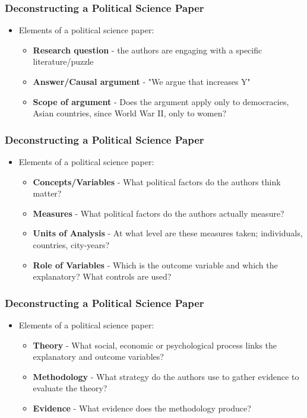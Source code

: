 \documentclass[xcolor=x11names,compress]{beamer}\usepackage[]{graphicx}\usepackage[]{color}
\renewcommand{\(}{\begin{columns}}
\renewcommand{\)}{\end{columns}}
\newcommand{\<}[1]{\begin{column}{#1}}
\renewcommand{\>}{\end{column}}
\begin{document}
\begin{frame}
\begin{frame}
\begin{frame}
\frametitle{Deconstructing a Political Science Paper}
\begin{itemize}
\item Elements of a political science paper:
\begin{itemize}
\item \textbf{Research question} - the authors are engaging with a specific literature/puzzle
\item \textbf{Answer/Causal argument} - "We argue that  increases Y"
\item \textbf{Scope of argument} - Does the argument apply only to democracies, Asian countries, since World War II, only to women?
\end{itemize}
\end{itemize}
\end{frame}

\begin{frame}
\frametitle{Deconstructing a Political Science Paper}
\begin{itemize}
\item Elements of a political science paper:
\begin{itemize}
\item \textbf{Concepts/Variables} - What political factors do the authors think matter?
\item \textbf{Measures} - What political factors do the authors actually measure?
\item \textbf{Units of Analysis} - At what level are these measures taken; individuals, countries, city-years?
\item \textbf{Role of Variables} - Which is the outcome variable and which the explanatory? What controls are used?
\end{itemize}
\end{itemize}
\end{frame}

\begin{frame}
\frametitle{Deconstructing a Political Science Paper}
\begin{itemize}
\item Elements of a political science paper:
\begin{itemize}
\item \textbf{Theory} - What social, economic or psychological process links the explanatory and outcome variables? 
\item \textbf{Methodology} - What strategy do the authors use to gather evidence to evaluate the theory?
\item \textbf{Evidence} - What evidence does the methodology produce?
\end{itemize}
\end{itemize}
\end{frame}


\end{frame}
\end{frame}
\end{document}
